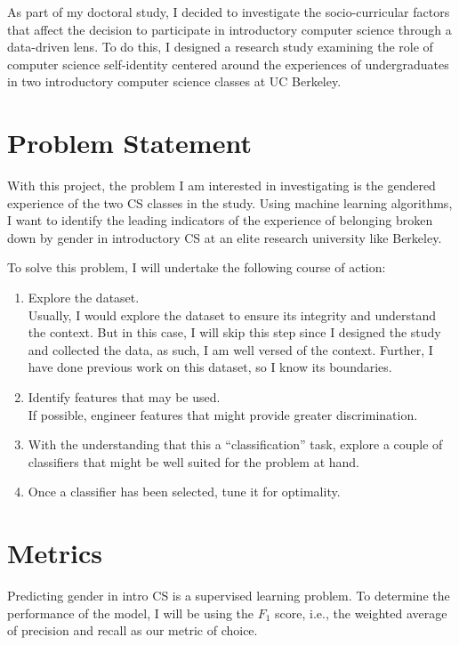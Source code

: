 As part of my doctoral study, I decided to investigate the socio-curricular factors that affect the decision to participate in introductory computer science through a data-driven lens. To do this, I designed a research study examining the role of computer science self-identity centered around the experiences of undergraduates in two introductory computer science classes at UC Berkeley. 


\section*{Problem Statement}

With this project, the problem I am interested in investigating is the gendered experience of the two CS classes in the study. Using machine learning algorithms, I want to identify the leading indicators of the experience of belonging broken down by gender in introductory CS at an elite research university like Berkeley.

To solve this problem, I will undertake the following course of action:
\begin{enumerate}%
\item Explore the dataset.\\
Usually, I would explore the dataset to ensure its integrity and understand the context. But in this case, I will skip this step since I designed the study and collected the data, as such, I am well versed of the context. Further, I have done previous work on this dataset, so I know its boundaries.
\item Identify features that may be used.\\ 
If possible, engineer features that might provide greater discrimination.
\item With the understanding that this a ``classification'' task, explore a couple of classifiers that might be well suited for the problem at hand.
\item Once a classifier has been selected, tune it for optimality.
\end{enumerate}

\section*{Metrics}


Predicting gender in intro CS is a supervised learning problem. To determine the performance of the model, I will be using the $F_1$ score, i.e., the weighted average of precision and recall as our metric of choice. 

